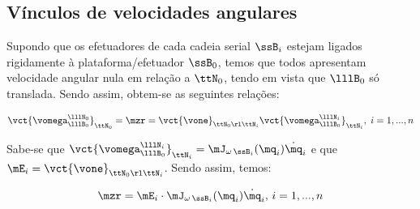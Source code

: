 \documentclass[]{politex}
\begin{document}
\subsection{Vínculos de velocidades angulares} 

Supondo que os efetuadores de cada cadeia serial $\ssB_i$ estejam ligados rigidamente à plataforma/efetuador $\ssB_0$, temos que todos apresentam velocidade angular nula em relação a $\ttN_0$, tendo em vista que $\lllB_0$ só translada. Sendo assim, obtem-se as seguintes relações:

\begin{equation}
\vct{\vomega^{\lllN_0}_{\lllB_0}}_{\ttN_0} = \mzr = \vct{\vone}_{\ttN_0 \rl \ttN_i}  \vct{\vomega^{\lllN_i}_{\lllB_0}}_{\ttN_i} , \; i = 1, ... , n
\end{equation}

Sabe-se que $\vct{\vomega^{\lllN_i}_{\lllB_0}}_{\ttN_i} =  \mJ_{\omega\,\ssB_i}(\mq_i) \dot{\mq}_i$ e que $\mE_i =\vct{\vone}_{\ttN_0 \rl \ttN_i}$. Sendo assim, temos:

\begin{equation}
\mzr = \mE_i \cdot \mJ_{\omega\,\ssB_i}(\mq_i) \dot{\mq}_i, \, i = 1,...,n
\end{equation}
\end{document}
